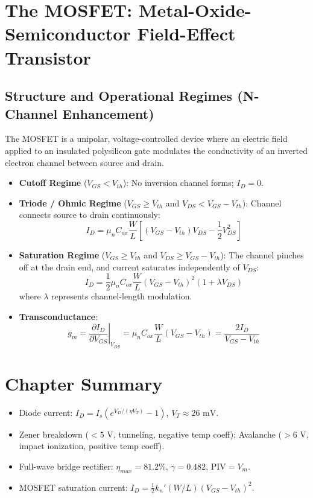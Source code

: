 \section{The MOSFET: Metal-Oxide-Semiconductor Field-Effect Transistor}

\subsection{Structure and Operational Regimes (N-Channel Enhancement)}
The MOSFET is a unipolar, voltage-controlled device where an electric field applied to an insulated polysilicon gate modulates the conductivity of an inverted electron channel between source and drain.
\begin{itemize}[leftmargin=1.5em]
    \item \textbf{Cutoff Regime} ($V_{GS} < V_{th}$): No inversion channel forms; $I_D = 0$.
    \item \textbf{Triode / Ohmic Regime} ($V_{GS} \ge V_{th}$ and $V_{DS} < V_{GS} - V_{th}$): Channel connects source to drain continuously:
    \begin{equation}
    I_D = \mu_n C_{ox} \frac{W}{L} \left[ (V_{GS} - V_{th})V_{DS} - \frac{1}{2}V_{DS}^2 \right]
    \end{equation}
    \item \textbf{Saturation Regime} ($V_{GS} \ge V_{th}$ and $V_{DS} \ge V_{GS} - V_{th}$): The channel pinches off at the drain end, and current saturates independently of $V_{DS}$:
    \begin{equation}
    I_D = \frac{1}{2} \mu_n C_{ox} \frac{W}{L} (V_{GS} - V_{th})^2 (1 + \lambda V_{DS})
    \end{equation}
    where $\lambda$ represents channel-length modulation.
    \item \textbf{Transconductance}:
    \begin{equation}
    g_m = \left.\frac{\partial I_D}{\partial V_{GS}}\right|_{V_{DS}} = \mu_n C_{ox}\frac{W}{L}(V_{GS} - V_{th}) = \frac{2 I_D}{V_{GS} - V_{th}}
    \end{equation}
\end{itemize}

\section{Chapter Summary}
\begin{itemize}[leftmargin=1.5em]
    \item Diode current: $I_D = I_s (e^{V_D / (\eta V_T)} - 1)$, $V_T \approx 26\text{ mV}$.
    \item Zener breakdown ($<5\text{ V}$, tunneling, negative temp coeff); Avalanche ($>6\text{ V}$, impact ionization, positive temp coeff).
    \item Full-wave bridge rectifier: $\eta_{max} = 81.2\%$, $\gamma = 0.482$, $\text{PIV} = V_m$.
    \item MOSFET saturation current: $I_D = \frac{1}{2} k_n' (W/L)(V_{GS} - V_{th})^2$.
\end{itemize}
